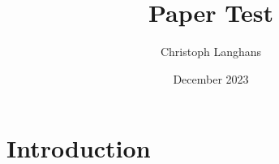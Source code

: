 \documentclass{article}
\title{Paper Test}
\author{Christoph Langhans}
\date{December 2023}
\begin{document}
\maketitle

\section{Introduction}
\end{document}
